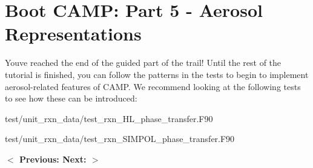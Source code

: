 \chapter{Boot CAMP\+: Part 5 -\/ Aerosol Representations}
\hypertarget{camp_tutorial_part_5}{}\label{camp_tutorial_part_5}
You\textquotesingle{}ve reached the end of the guided part of the trail! Until the rest of the tutorial is finished, you can follow the patterns in the tests to begin to implement aerosol-\/related features of CAMP. We recommend looking at the following tests to see how these can be introduced\+:


\begin{DoxyItemize}
\item {\ttfamily test/unit\+\_\+rxn\+\_\+data/test\+\_\+rxn\+\_\+\+HL\+\_\+phase\+\_\+transfer.\+F90}
\item {\ttfamily test/unit\+\_\+rxn\+\_\+data/test\+\_\+rxn\+\_\+\+SIMPOL\+\_\+phase\+\_\+transfer.\+F90}
\end{DoxyItemize}

 {\bfseries{ \texorpdfstring{$<$}{<} Previous\+: }}     {\bfseries{ Next\+: }}  {\bfseries{ \texorpdfstring{$>$}{>} }} 